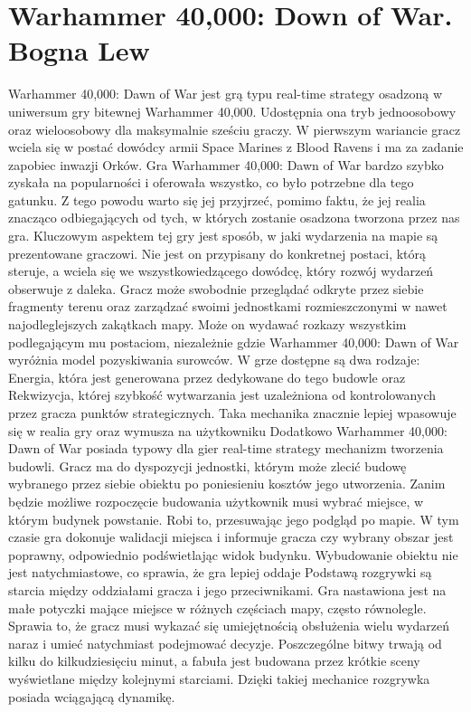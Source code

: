 \section{Warhammer 40,000: Down of War. Bogna Lew}

Warhammer 40,000: Dawn of War jest grą typu real-time strategy osadzoną w uniwersum gry bitewnej Warhammer 40,000. Udostępnia
ona tryb jednoosobowy oraz wieloosobowy dla maksymalnie sześciu graczy. W pierwszym wariancie gracz wciela się w postać dowódcy
armii Space Marines z Blood Ravens i ma za zadanie zapobiec inwazji Orków. Gra Warhammer 40,000: Dawn of War bardzo szybko
zyskała na popularności i oferowała wszystko, co było potrzebne dla tego gatunku. Z tego powodu warto się jej przyjrzeć,
pomimo faktu, że jej realia znacząco odbiegających od tych, w których zostanie osadzona tworzona przez nas gra.
Kluczowym aspektem tej gry jest sposób, w jaki wydarzenia na mapie są prezentowane graczowi. Nie jest on przypisany do
konkretnej postaci, którą steruje, a wciela się we wszystkowiedzącego dowódcę, który rozwój wydarzeń obserwuje z daleka.
Gracz może swobodnie przeglądać odkryte przez siebie fragmenty terenu oraz zarządzać swoimi jednostkami rozmieszczonymi
w nawet najodleglejszych zakątkach mapy. Może on wydawać rozkazy wszystkim podlegającym mu postaciom, niezależnie gdzie
Warhammer 40,000: Dawn of War wyróżnia model pozyskiwania surowców. W grze dostępne są dwa rodzaje: Energia, która jest
generowana przez dedykowane do tego budowle oraz Rekwizycja, której szybkość wytwarzania jest uzależniona od kontrolowanych
przez gracza punktów strategicznych. Taka mechanika znacznie lepiej wpasowuje się w realia gry oraz wymusza na użytkowniku
Dodatkowo Warhammer 40,000: Dawn of War posiada typowy dla gier real-time strategy mechanizm tworzenia budowli. Gracz ma
do dyspozycji jednostki, którym może zlecić budowę wybranego przez siebie obiektu po poniesieniu kosztów jego utworzenia.
Zanim będzie możliwe rozpoczęcie budowania użytkownik musi wybrać miejsce, w którym budynek powstanie. Robi to, przesuwając
jego podgląd po mapie. W tym czasie gra dokonuje walidacji miejsca i informuje gracza czy wybrany obszar jest poprawny,
odpowiednio podświetlając widok budynku. Wybudowanie obiektu nie jest natychmiastowe, co sprawia, że gra lepiej oddaje
Podstawą rozgrywki są starcia między oddziałami gracza i jego przeciwnikami. Gra nastawiona jest na małe potyczki mające
miejsce w różnych częściach mapy, często równolegle. Sprawia to, że gracz musi wykazać się umiejętnością obsłużenia wielu
wydarzeń naraz i umieć natychmiast podejmować decyzje. Poszczególne bitwy trwają od kilku do kilkudziesięciu minut, a
fabuła jest budowana przez krótkie sceny wyświetlane między kolejnymi starciami. Dzięki takiej mechanice rozgrywka
posiada wciągającą dynamikę.
